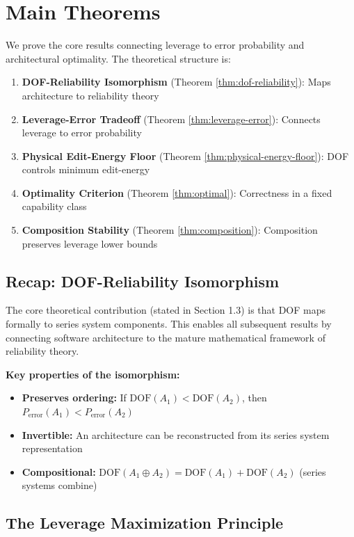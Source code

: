 \section{Main Theorems}\label{main-theorems}

We prove the core results connecting leverage to error probability and architectural optimality. The theoretical structure is:

\begin{enumerate}
\item \textbf{DOF-Reliability Isomorphism} (Theorem \ref{thm:dof-reliability}): Maps architecture to reliability theory
\item \textbf{Leverage-Error Tradeoff} (Theorem \ref{thm:leverage-error}): Connects leverage to error probability
\item \textbf{Physical Edit-Energy Floor} (Theorem \ref{thm:physical-energy-floor}): DOF controls minimum edit-energy
\item \textbf{Optimality Criterion} (Theorem \ref{thm:optimal}): Correctness in a fixed capability class
\item \textbf{Composition Stability} (Theorem \ref{thm:composition}): Composition preserves leverage lower bounds
\end{enumerate}

\subsection{Recap: DOF-Reliability Isomorphism}

The core theoretical contribution (stated in Section 1.3) is that DOF maps formally to series system components. This enables all subsequent results by connecting software architecture to the mature mathematical framework of reliability theory.

\textbf{Key properties of the isomorphism:}
\begin{itemize}
\item \textbf{Preserves ordering:} If $\text{DOF}(A_1) < \text{DOF}(A_2)$, then $P_{\text{error}}(A_1) < P_{\text{error}}(A_2)$
\item \textbf{Invertible:} An architecture can be reconstructed from its series system representation
\item \textbf{Compositional:} $\text{DOF}(A_1 \oplus A_2) = \text{DOF}(A_1) + \text{DOF}(A_2)$ (series systems combine)
\end{itemize}

\subsection{The Leverage Maximization Principle}

